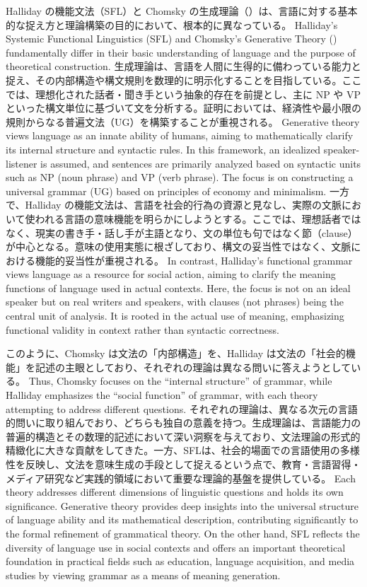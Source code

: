 \ifJPN
Halliday の機能文法（SFL）と Chomsky の生成理論（\textcite{chomsky1965aspects}）は、言語に対する基本的な捉え方と理論構築の目的において、根本的に異なっている。
\else
  Halliday's Systemic Functional Linguistics (SFL) and Chomsky's Generative Theory (\textcite{chomsky1965aspects}) fundamentally differ in their basic understanding of language and the purpose of theoretical construction.
\fi
\ifJPN
生成理論は、言語を人間に生得的に備わっている能力と捉え、その内部構造や構文規則を数理的に明示化することを目指している。ここでは、理想化された話者・聞き手という抽象的存在を前提とし、主に NP や VP といった構文単位に基づいて文を分析する。証明においては、経済性や最小限の規則からなる普遍文法（UG）を構築することが重視される。
\else
Generative theory views language as an innate ability of humans, aiming to mathematically clarify its internal structure and syntactic rules. In this framework, an idealized speaker-listener is assumed, and sentences are primarily analyzed based on syntactic units such as NP (noun phrase) and VP (verb phrase). The focus is on constructing a universal grammar (UG) based on principles of economy and minimalism.
\fi
\ifJPN
一方で、Halliday の機能文法は、言語を社会的行為の資源と見なし、実際の文脈において使われる言語の意味機能を明らかにしようとする。ここでは、理想話者ではなく、現実の書き手・話し手が主語となり、文の単位も句ではなく節（clause）が中心となる。意味の使用実態に根ざしており、構文の妥当性ではなく、文脈における機能的妥当性が重視される。
\else
In contrast, Halliday's functional grammar views language as a resource for social action, aiming to clarify the meaning functions of language used in actual contexts. Here, the focus is not on an ideal speaker but on real writers and speakers, with clauses (not phrases) being the central unit of analysis. It is rooted in the actual use of meaning, emphasizing functional validity in context rather than syntactic correctness.
\fi

\ifJPN
このように、Chomsky は文法の「内部構造」を、Halliday は文法の「社会的機能」を記述の主眼としており、それぞれの理論は異なる問いに答えようとしている。
\else
Thus, Chomsky focuses on the ``internal structure'' of grammar, while Halliday emphasizes the ``social function'' of grammar, with each theory attempting to address different questions.
\fi
\ifJPN
それぞれの理論は、異なる次元の言語的問いに取り組んでおり、どちらも独自の意義を持つ。生成理論は、言語能力の普遍的構造とその数理的記述において深い洞察を与えており、文法理論の形式的精緻化に大きな貢献をしてきた。一方、SFLは、社会的場面での言語使用の多様性を反映し、文法を意味生成の手段として捉えるという点で、教育・言語習得・メディア研究など実践的領域において重要な理論的基盤を提供している。
\else
Each theory addresses different dimensions of linguistic questions and holds its own significance. Generative theory provides deep insights into the universal structure of language ability and its mathematical description, contributing significantly to the formal refinement of grammatical theory. On the other hand, SFL reflects the diversity of language use in social contexts and offers an important theoretical foundation in practical fields such as education, language acquisition, and media studies by viewing grammar as a means of meaning generation.
\fi

